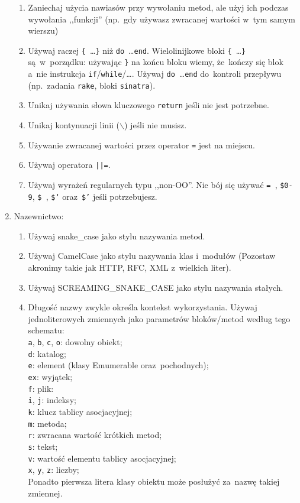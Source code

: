 \begin{enumerate}
\begin{enumerate}
    \item Zaniechaj użycia nawiasów przy wywołaniu metod, ale użyj ich podczas wywołania ,,funkcji'' (np.~gdy używasz zwracanej wartości w~tym samym wierszu)
    \item Używaj raczej \mbox{\texttt{\{} \ldots \texttt{\}}} niż \mbox{\texttt{do} \ldots \texttt{end}}. Wielolinijkowe bloki \mbox{\texttt{\{} \ldots \texttt{\}}} są~w~porządku: używając \texttt{\}} na końcu bloku wiemy, że~kończy się blok a~nie instrukcja \texttt{if}/\texttt{while}/\ldots. Używaj \mbox{\texttt{do} \ldots \texttt{end}} do~kontroli przepływu (np.~zadania \texttt{rake}, bloki \texttt{sinatra}).
    \item Unikaj używania słowa kluczowego \texttt{return} jeśli nie jest potrzebne.
    \item Unikaj kontynuacji linii (\texttt{$ \backslash $}) jeśli nie musisz.
    \item Używanie zwracanej wartości przez operator \texttt{=} jest na miejscu.
    \item Używaj operatora \texttt{||=}.
    \item Używaj wyrażeń regularnych typu ,,non-OO''.  Nie bój się używać \texttt{=~}, \texttt{\$0-9}, \texttt{\$~}, \texttt{\$`} oraz~\texttt{\$'} jeśli potrzebujesz.
  \end{enumerate}
  \item Nazewnictwo:
  \begin{enumerate}
    \item Używaj snake\_case jako stylu nazywania metod.
    \item Używaj CamelCase jako stylu nazywania klas i~modułów (Pozostaw akronimy takie jak HTTP, RFC, XML z~wielkich liter).
    \item Używaj SCREAMING\_SNAKE\_CASE jako stylu nazywania stałych.
    \item Długość nazwy zwykle określa kontekst wykorzystania. Używaj jednoliterowych zmiennych jako parametrów bloków/metod według tego schematu:\\
      \texttt{a}, \texttt{b}, \texttt{c}, \texttt{o}: dowolny obiekt;\\
      \texttt{d}: katalog;\\
      \texttt{e}: element (klasy Emumerable oraz~pochodnych);\\
      \texttt{ex}: wyjątek;\\
      \texttt{f}: plik:\\
      \texttt{i}, \texttt{j}: indeksy;\\
      \texttt{k}: klucz tablicy asocjacyjnej;\\
      \texttt{m}: metoda;\\
      \texttt{r}: zwracana wartość krótkich metod;\\
      \texttt{s}: tekst;\\
      \texttt{v}: wartość elementu tablicy asocjacyjnej;\\
      \texttt{x}, \texttt{y}, \texttt{z}: liczby;\\
      Ponadto pierwsza litera klasy obiektu może posłużyć za~nazwę takiej zmiennej.


\end{enumerate}
\end{enumerate}
